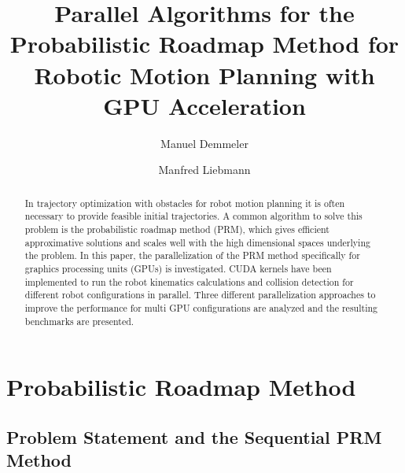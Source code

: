\documentclass[twocolumn]{svjour3}
\title{Parallel Algorithms for the Probabilistic Roadmap Method for Robotic Motion Planning with GPU Acceleration}
\author{Manuel Demmeler \and Manfred Liebmann}
\institute{Manuel Demmeler, Manfred Liebmann\\ 
\at Technische Universit\"at M\"unchen\\
Center for Mathematical Sciences, M17 \\
Boltzmannstra{\ss}e 3,
85748 Garching by Munich \\ 
\email{manuel.demmeler@tum.de, manfred.liebmann@tum.de}
}
\begin{document}
\maketitle

\begin{abstract}
%
In trajectory optimization with obstacles for robot motion planning it is often necessary to provide feasible initial trajectories. 
A common algorithm to solve this problem is the probabilistic roadmap method (PRM), which gives efficient approximative solutions and scales well with the high dimensional spaces underlying the problem.
%
%
In this paper, the parallelization of the PRM method specifically for graphics processing units (GPUs) is investigated.
CUDA kernels have been implemented to run the robot kinematics calculations and collision detection for different robot configurations in parallel.
Three different parallelization approaches to improve the performance for multi GPU configurations are analyzed and the resulting benchmarks are presented.
%
\end{abstract}

\section{Probabilistic Roadmap Method}
\subsection{Problem Statement and the Sequential PRM Method}\label{algintro}
\end{document}
